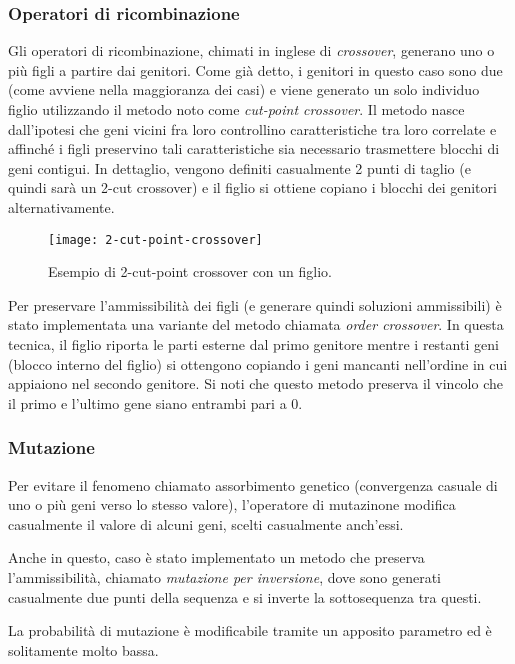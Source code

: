 \subsubsection{Operatori di ricombinazione}\label{subsubsec:operatori-ricombinazione}
Gli operatori di ricombinazione, chimati in inglese di \textit{crossover}, generano uno o più figli a partire dai genitori.
Come già detto, i genitori in questo caso sono due (come avviene nella maggioranza dei casi) e viene generato
un solo individuo figlio utilizzando il metodo noto come \textit{cut-point crossover}.
Il metodo nasce dall'ipotesi che geni vicini fra loro controllino caratteristiche tra loro correlate e
affinché i figli preservino tali caratteristiche sia necessario trasmettere blocchi di geni contigui.
In dettaglio, vengono definiti casualmente 2 punti di taglio (e quindi sarà un 2-cut crossover) e il figlio si ottiene
copiano i blocchi dei genitori alternativamente.
\begin{figure}[!h]
\begin{center}
	\texttt{[image: 2-cut-point-crossover]}
{\scriptsize \caption{Esempio di 2-cut-point crossover con un figlio.}
\label{fig:2-cut-point-crossover}}
\end{center}
\end{figure}
Per preservare l'ammissibilità dei figli (e generare quindi soluzioni ammissibili) è stato implementata
una variante del metodo chiamata \textit{order crossover}.
In questa tecnica, il figlio riporta le parti esterne dal primo genitore mentre i restanti geni (blocco interno del figlio)
si ottengono copiando i geni mancanti nell'ordine in cui appiaiono nel secondo genitore.
Si noti che questo metodo preserva il vincolo che il primo e l'ultimo gene siano entrambi pari a 0.
\subsubsection{Mutazione}\label{subsubsec:mutazione}
Per evitare il fenomeno chiamato assorbimento genetico (convergenza casuale di uno o più geni verso lo stesso valore),
l'operatore di mutazinone modifica casualmente il valore di alcuni geni, scelti casualmente anch'essi.

Anche in questo, caso è stato implementato un metodo che preserva l'ammissibilità, chiamato \textit{mutazione per inversione},
dove sono generati casualmente due punti della sequenza e si inverte la sottosequenza tra questi.

La probabilità di mutazione è modificabile tramite un apposito parametro ed è solitamente molto bassa.
